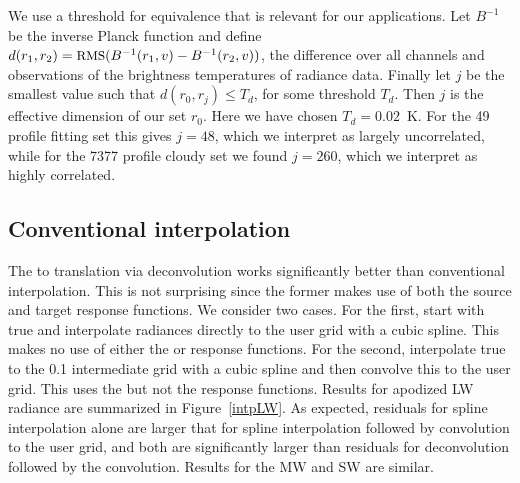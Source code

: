 \documentclass[journal]{IEEEtran}
\begin{document}
We use a threshold for equivalence that is relevant for our
applications.  Let $B^{-1}$ be the inverse Planck function and
define $d(r_1, r_2) = \mbox{\small RMS}(B^{-1}(r_1, v) - B^{-1}(r_2, v))$, the
{\rms} difference over all channels and observations of the
brightness temperatures of radiance data.  Finally let $j$ be the
smallest value such that $d(r_0, r_j) \le T_d$, for some threshold
$T_d$.  Then $j$ is the effective dimension of our set $r_0$.  Here
we have chosen $T_d = 0.02$~K.  For the 49 profile fitting set this
gives $j=48$, which we interpret as largely uncorrelated, while for
the 7377 profile cloudy set we found $j=260$, which we interpret as
highly correlated.

\subsection{Conventional interpolation}
\label{interp}

The {\airs} to {\cris} translation via deconvolution works
significantly better than conventional interpolation.  This is not
surprising since the former makes use of both the source and target
response functions.  We consider two cases.  For the first, start
with true {\airs} and interpolate radiances directly to the {\cris}
user grid with a cubic spline.  This makes no use of either the
{\airs} or {\cris} response functions.  For the second, interpolate
true {\airs} to the 0.1 {\wn} intermediate grid with a cubic spline
and then convolve this to the {\cris} user grid.  This uses the
{\cris} but not the {\airs} response functions.  Results for
apodized {\cris} LW radiance are summarized in Figure~\ref{intpLW}.
As expected, residuals for spline interpolation alone are larger
that for spline interpolation followed by convolution to the {\cris}
user grid, and both are significantly larger than residuals for
{\airs} deconvolution followed by the {\cris} convolution.  Results
for the MW and SW are similar.
\end{document}
